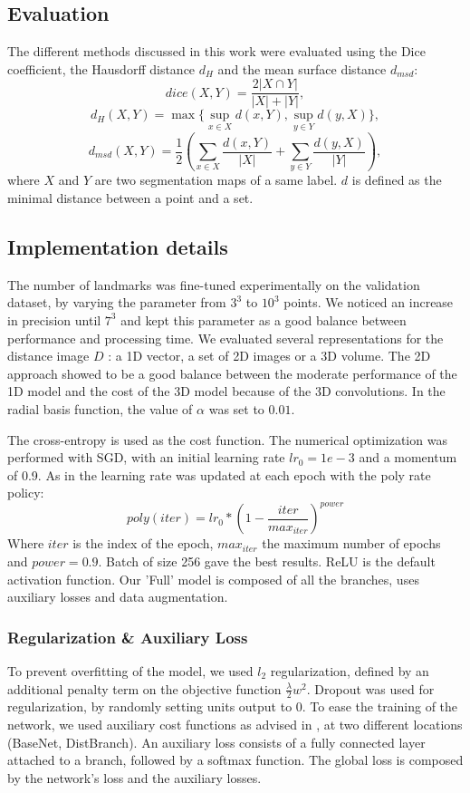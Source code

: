 \documentclass{article}
\begin{document}
\subsection{Evaluation}
The different methods discussed in this work were evaluated using the Dice coefficient,
the Hausdorff distance $d_H$ and the mean surface distance $d_{msd}$:
$$dice(X,Y) = \frac{2|X \cap Y|}{|X| + |Y|},$$
$$d_H(X,Y) = \max \{ \sup_{x \in \mathit{X}} d(x,Y), \sup_{y \in \mathit{Y}} d(y,X) \},$$
$$d_{msd}(X,Y) = \frac{1}{2}\left(\displaystyle\sum_{x \in \mathit{X}} \frac{d(x,Y)}{|\mathit{X}|} + \displaystyle\sum_{y \in \mathit{Y}} \frac{d(y,X)}{|\mathit{Y}|}\right),$$
where $\mathit{X}$ and $\mathit{Y}$ are two segmentation maps of a same label. $d$ is defined as the minimal distance between a point and a set.

\subsection{Implementation details}
The number of landmarks was fine-tuned experimentally on the validation dataset, by varying the parameter from $3^3$ to $10^3$ points. We noticed an increase in precision until $7^3$ and kept this parameter as a good balance between performance and processing time.
We evaluated several representations for the distance image $D$ : a 1D vector, a set of 2D images or a 3D volume.
The 2D approach showed to be a good balance between the moderate performance of the 1D model and the cost of the 3D model because of the 3D convolutions. In the radial basis function, the value of $\alpha$ was set to $0.01$.

The cross-entropy is used as the cost function. The numerical optimization was performed with SGD, with an initial learning rate $lr_0 = 1e-3$ and a momentum of 0.9. As in \cite{DBLP:journals/corr/ChenPK0Y16} the learning rate was updated at each epoch with the poly rate policy:
$$poly(iter) = lr_{0} *\left(1-\frac{iter}{max_{iter}}\right)^{power}$$
Where $iter$ is the index of the epoch, $max_{iter}$ the maximum number of epochs and $power=0.9$. Batch of size 256 gave the best results.
ReLU is the default activation function. Our 'Full' model is composed of all the branches, uses auxiliary losses and data augmentation.

\subsubsection{Regularization \& Auxiliary Loss}
To prevent overfitting of the model, we used $l_2$ regularization, defined by an additional penalty term on the objective function $\frac{\lambda}{2} w^2$.
Dropout \cite{srivastava2014dropout} was used for regularization, by randomly setting units output to 0.
To ease the training of the network, we used auxiliary cost functions as advised in \cite{szegedy2017inception}, at two different locations (BaseNet, DistBranch). An auxiliary loss consists of a fully connected layer attached to a branch, followed by a softmax function. The global loss is composed by the network's loss and the auxiliary losses.
\end{document}
